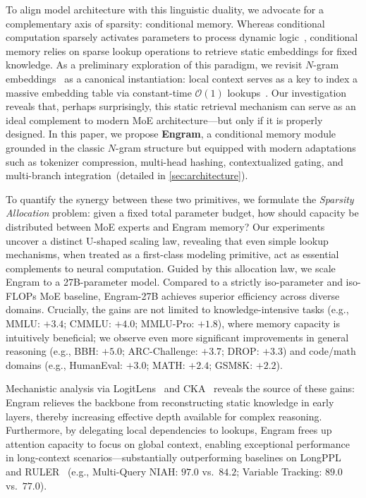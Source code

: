 To align model architecture with this linguistic duality, we advocate for a complementary axis of sparsity: conditional memory. Whereas conditional computation sparsely activates parameters to process dynamic logic~\citep{shazeer2017outrageously,bengio2013estimatingpropagatinggradientsstochastic}, conditional memory relies on sparse lookup operations to retrieve static embeddings for fixed knowledge. As a preliminary exploration of this paradigm, we revisit $N$-gram embeddings~\citep{bojanowski2017enriching} as a canonical instantiation: local context serves as a key to index a massive embedding table via constant-time $\mathcal{O}(1)$ lookups~\citep{tito2017hash,huang2025over,pagnoni2025byte,yu2025scaling}. Our investigation reveals that, perhaps surprisingly, this static retrieval mechanism can serve as an ideal complement to modern MoE architecture—but only if it is properly designed. In this paper, we propose \textbf{Engram}, a conditional memory module grounded in the classic $N$-gram structure but equipped with modern adaptations such as tokenizer compression, multi-head hashing, contextualized gating, and multi-branch integration~(detailed in \autoref{sec:architecture}).

To quantify the synergy between these two primitives, we formulate the \textit{Sparsity Allocation} problem: given a fixed total parameter budget, how should capacity be distributed between MoE experts and Engram memory? Our experiments uncover a distinct U-shaped scaling law, revealing that even simple lookup mechanisms, when treated as a first-class modeling primitive, act as essential complements to neural computation. 
Guided by this allocation law, we scale Engram to a 27B-parameter model. Compared to a strictly iso-parameter and iso-FLOPs MoE baseline, Engram-27B achieves superior efficiency across diverse domains. Crucially, the gains are not limited to knowledge-intensive tasks (e.g., MMLU: $+3.4$; CMMLU: $+4.0$; MMLU-Pro: $+1.8$), where memory capacity is intuitively beneficial; we observe even more significant improvements in general reasoning (e.g., BBH: $+5.0$; ARC-Challenge: $+3.7$; DROP: $+3.3$) and code/math domains (e.g., HumanEval: $+3.0$; MATH: $+2.4$; GSM8K: $+2.2$). 

Mechanistic analysis via LogitLens~\citep{nostalgebraist2020logitlens} and CKA~\citep{hendrycks2020measuring} reveals the source of these gains: Engram relieves the backbone from reconstructing static knowledge in early layers, thereby increasing effective depth available for complex reasoning.
Furthermore, by delegating local dependencies to lookups, Engram frees up attention capacity to focus on global context, enabling exceptional performance in long-context scenarios—substantially outperforming baselines on LongPPL~\citep{fangwrong} and RULER~\citep{hsiehruler} (e.g., Multi-Query NIAH: $97.0$ vs.\ $84.2$; Variable Tracking: $89.0$ vs.\ $77.0$).

